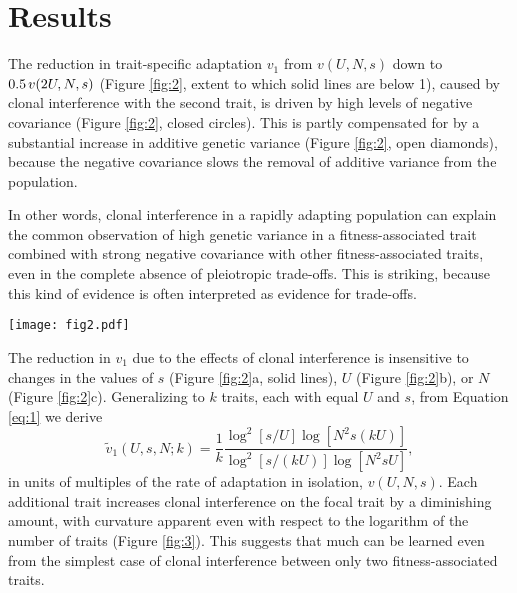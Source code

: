 \documentclass[9pt,twocolumn,twoside]{gsajnl}
\begin{document}
\section*{Results}
\label{sec:results}
The reduction in trait-specific adaptation $v_1$ from $v(U,N,s)$ down to $0.5 \hspace{.02 in} v(2U,N,s)$ (Figure \ref{fig:2}, extent to which solid lines are below 1), caused by clonal interference with the second trait, is driven by high levels of negative covariance (Figure \ref{fig:2}, closed circles). This is partly compensated for by a substantial increase in additive genetic variance (Figure \ref{fig:2}, open diamonds), because the negative covariance slows the removal of additive variance from the population. 

In other words, clonal interference in a rapidly adapting population can explain the common observation of high genetic variance in a fitness-associated trait combined with strong negative covariance with other fitness-associated traits, even in the complete absence of pleiotropic trade-offs. This is striking, because this kind of evidence is often interpreted as evidence for trade-offs. 

\begin{figure*}[!ht]
\centering
\texttt{[image: fig2.pdf]} 
\caption{Mean values in variance (open diamonds) of one trait and its covariance (closed circles) with the other, with their expected sum equal to the analytically calculated adaptation rate (solid line). Each average was calculated from one simulation that ran 1,000,000 generations. Variance of the focal trait is always higher than it would be in the absence of the second trait ($\sigma_1^2 >1$); negative covariance more than cancels this out ($|\sigma_{1,2}| > \sigma_1^2-1$) to reduce the adaptation rate.  Mean variance and covariance are insensitive to changes in the population size $N$ (c), but exhibit some dependence on the values of $s$ (a) and $U$ (b). For the parameter values not being varied on the x-axis, $s=0.02$, $U=10^{-5}$ and $N=10^9$. }\label{fig:2}
\end{figure*}

The reduction in $v_1$ due to the effects of clonal interference is insensitive to changes in the values of $s$ (Figure \ref{fig:2}a, solid lines),  $U$ (Figure \ref{fig:2}b), or $N$ (Figure \ref{fig:2}c). Generalizing to $k$ traits, each with equal $U$ and $s$, from Equation \eqref{eq:1}  we derive
\begin{equation}\label{eq:6}
 \tilde{v}_1 (U,s,N;k) 
= \frac{1}{k}\frac{\log^2[s/U]\log[N^2s(kU)]}{\log^2[s/(kU)]\log[N^2sU]},
\end{equation}
in units of multiples of the rate of adaptation in isolation, $v(U,N,s)$. Each additional trait increases clonal interference on the focal trait by a diminishing amount, with curvature apparent even with respect to the logarithm of the number of traits (Figure \ref{fig:3}). This suggests that much can be learned even from the simplest case of clonal interference between only two fitness-associated traits.
\end{document}
